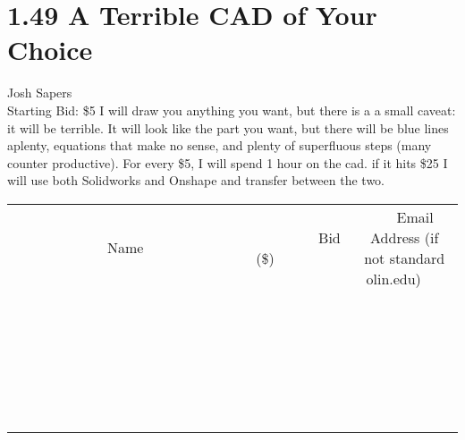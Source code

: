 \documentclass[11pt]{article}
\begin{document}
\section*{1.49 A Terrible CAD of Your Choice}
Josh Sapers
\\
Starting Bid: \$5
\newline
I will draw you anything you want, but there is a a small caveat: it will be terrible. It will look like the part you want, but there will be blue lines aplenty, equations that make no sense, and plenty of superfluous steps (many counter productive). For every \$5, I will spend 1 hour on the cad. if it hits \$25 I will use both Solidworks and Onshape and transfer between the two.
\\[6ex]
\begin{tabular}{c c c}
~~~~~~~~~~~~~Name~~~~~~~~~~~~~ & ~~~~~~~~~Bid (\$)~~~~~~~~~  & ~~~Email Address (if not standard olin.edu)~~~\\
 & & \\
\hline
 & & \\
\hline
 & & \\
\hline
 & & \\
\hline
 & & \\
\hline
 & & \\
\hline
 & & \\
\hline
 & & \\
\hline
 & & \\
\hline
 & & \\
\hline
 & & \\
\hline
 & & \\
\hline
 & & \\
\hline
 & & \\
\hline
 & & \\
\hline
 & & \\
\hline
 & & \\
\hline
 & & \\
\hline
 & & \\
\hline
 & & \\
\hline
 & & \\
\hline
 & & \\
\hline
 & & \\
\hline
 & & \\
\hline
 & & \\
\hline
 & & \\
\hline
\end{tabular}
\newpage
\end{document}
